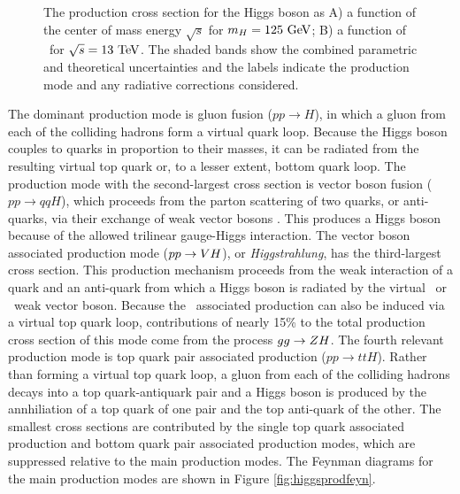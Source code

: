 \begin{figure}[htbp]
{  }
  \caption[Higgs Boson Production Cross Sections]{The production cross section for the Higgs boson as A) a function of the center of mass energy $\sqrt{s}$ for $m_{H} = 125\ \mathrm{GeV}$; B) a function of \massH\ for $\sqrt{s} = 13\ \mathrm{TeV}$. The shaded bands show the combined parametric and theoretical uncertainties and the labels indicate the production mode and any radiative corrections considered.\cite{CERNYR4}}
  \label{fig:higgsprodxsec}
\end{figure}

The dominant production mode is gluon fusion ($pp \rightarrow H$), in which a gluon from each of the colliding hadrons form a virtual quark loop. Because the Higgs boson couples to quarks in proportion to their masses, it can be radiated from the resulting virtual top quark or, to a lesser extent, bottom quark loop. The production mode with the second-largest cross section is vector boson fusion ($pp \rightarrow qqH$), which proceeds from the parton scattering of two quarks, or anti-quarks, via their exchange of weak vector bosons \bosV. This produces a Higgs boson because of the allowed trilinear gauge-Higgs interaction. The vector boson associated production mode ($pp \rightarrow VH$), or \textit{Higgstrahlung}, has the third-largest cross section. This production mechanism proceeds from the weak interaction of a quark and an anti-quark from which a Higgs boson is radiated by the virtual \bosW\ or \bosZ\ weak vector boson. Because the \bosZ\ associated production can also be induced via a virtual top quark loop, contributions of nearly 15\% to the total production cross section of this mode come from the process $gg \rightarrow ZH$. The fourth relevant production mode is top quark pair associated production ($pp \rightarrow ttH$). Rather than forming a virtual top quark loop, a gluon from each of the colliding hadrons decays into a top quark-antiquark pair and a Higgs boson is produced by the annhiliation of a top quark of one pair and the top anti-quark of the other. The smallest cross sections are contributed by the single top quark associated production and bottom quark pair associated production modes, which are suppressed relative to the main production modes. The Feynman diagrams for the main production modes are shown in Figure \ref{fig:higgsprodfeyn}.

